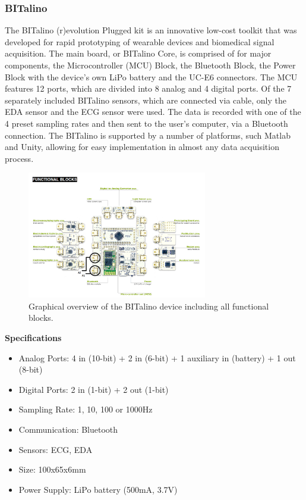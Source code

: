 \subsubsection{BITalino}
The BITalino (r)evolution Plugged kit is an innovative low-cost toolkit that was developed for rapid prototyping of wearable devices and biomedical signal acquisition. The main board, or BITalino Core, is comprised of for major components, the Microcontroller (MCU) Block, the Bluetooth Block, the Power Block with the device's own LiPo battery and the UC-E6 connectors. The MCU features 12 ports, which are divided into 8 analog and 4 digital ports. Of the 7 separately included BITalino sensors, which are connected via cable, only the EDA sensor and the ECG sensor were used. The data is recorded with one of the 4 preset sampling rates and then sent to the user's computer, via a Bluetooth connection. The BITalino is supported by a number of platforms, such Matlab and Unity, allowing for easy implementation in almost any data acquisition process.\\

\begin{figure}[ht]
\centering
\includegraphics[width=0.7\textwidth]{images/BitOverview.png}
\caption{Graphical overview of the BITalino device including all functional blocks.}
\label{bitImg}
\end{figure}

\textbf{Specifications}
\begin{itemize}
\item Analog Ports: 4 in (10-bit) + 2 in (6-bit) + 1 auxiliary in (battery) + 1 out (8-bit)
\item Digital Ports: 2 in (1-bit) + 2 out (1-bit)
\item Sampling Rate: 1, 10, 100 or 1000Hz
\item Communication: Bluetooth
\item Sensors: ECG, EDA
\item Size: 100x65x6mm
\item Power Supply: LiPo battery (500mA, 3.7V)
\end{itemize}

